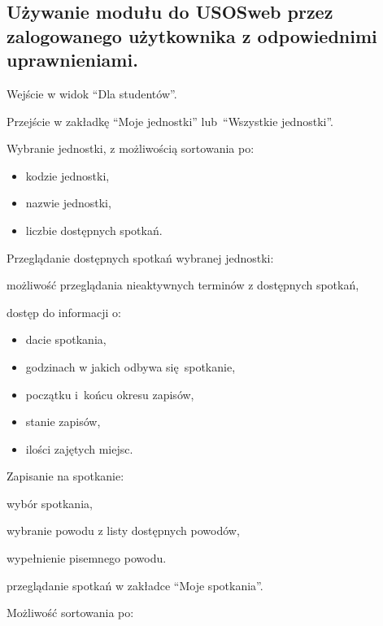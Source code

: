 \documentclass[licencjacka]{pracamgr}
\begin{document}
\subsection{Używanie modułu do USOSweb przez zalogowanego użytkownika z odpowiednimi uprawnieniami.}
	\begin{step}
			\item Wejście w widok \enquote{Dla studentów}.
			\item Przejście w zakładkę \enquote{Moje jednostki} lub~\enquote{Wszystkie jednostki}.
			\item Wybranie jednostki, z możliwością sortowania po:
				\begin{itemize}
					\item kodzie jednostki,
					\item nazwie jednostki,
					\item liczbie dostępnych spotkań. 
				\end{itemize}
			\item Przeglądanie dostępnych spotkań wybranej jednostki:
				\begin{step}
					\item możliwość przeglądania nieaktywnych terminów z dostępnych spotkań,
					\item dostęp do informacji o:
						\begin{itemize}
							\item dacie spotkania,
							\item godzinach w jakich odbywa się~spotkanie,
							\item początku i~końcu okresu zapisów,
							\item stanie zapisów,
							\item ilości zajętych miejsc.
						\end{itemize}
				\end{step}
			\item Zapisanie na spotkanie:
				\begin{step}
					\item wybór spotkania,
					\item wybranie powodu z listy dostępnych powodów,
					\item wypełnienie pisemnego powodu.
				\end{step}
			\item przeglądanie spotkań w zakładce \enquote{Moje spotkania}.
				\begin{step}
					\item Możliwość sortowania po:
						\begin{itemize}

\end{itemize}
\end{step}
\end{step}
\end{document}
